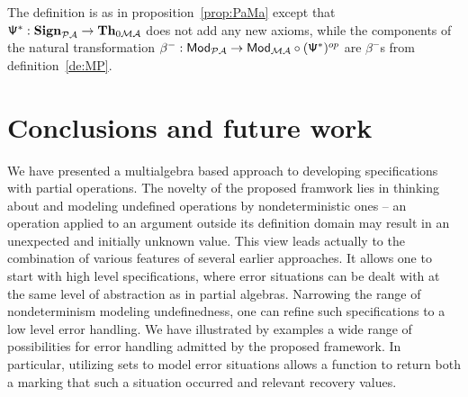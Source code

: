 \documentclass[10pt]{article}
\begin{document}
\begin{PROOFs} The definition is as in proposition~\ref{prop:PaMa}
except that ${\sf {\Psi}}^*:{\bf Sign}_{{\mathcal{PA}}} \to
{\bf Th}_{0{\mathcal{MA}}}$ does not add any new axioms, while the components of
the natural transformation $\beta^-:{\sf {Mod}}_{{\mathcal{PA}}} \to
{\sf {Mod}}_{{\mathcal{MA}}} \circ ({\sf {\Psi}}^*)^{op}$ are $\beta^-$s from
definition~\ref{de:MP}.
\end{PROOFs}\vspace*{-2ex}
%

\section{Conclusions and future work}
We have presented a multialgebra based approach to developing specifications
with partial operations. The novelty of the proposed framwork lies in
thinking about and modeling undefined operations by nondeterministic ones --
an operation applied to an argument outside its definition domain may result
in an unexpected and initially unknown value. This view leads actually
to the combination of various features of several earlier approaches. It
allows one to start with high level specifications, where error
situations can be dealt with at the same level of abstraction as in partial
algebras. Narrowing the range of nondeterminism modeling undefinedness, one
can refine such specifications to a low level error handling. 
We have illustrated by examples a wide range of possibilities for error
handling admitted by the proposed framework. In particular, utilizing sets to
model error situations allows a function to return both a marking that such a
situation occurred and relevant recovery values.
\end{document}
